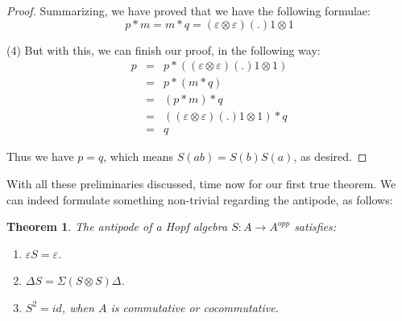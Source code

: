 \documentclass[12pt]{amsbook}
\newtheorem{theorem}{Theorem}[chapter]
\begin{document}
\begin{proof}
Summarizing, we have proved that we have the following formulae:
$$p*m=m*q=(\varepsilon\otimes\varepsilon)(.)1\otimes1$$

(4) But with this, we can finish our proof, in the following way:
\begin{eqnarray*}
p
&=&p*((\varepsilon\otimes\varepsilon)(.)1\otimes1)\\
&=&p*(m*q)\\
&=&(p*m)*q\\
&=&((\varepsilon\otimes\varepsilon)(.)1\otimes1)*q\\
&=&q
\end{eqnarray*}

Thus we have $p=q$, which means $S(ab)=S(b)S(a)$, as desired.
\end{proof}

With all these preliminaries discussed, time now for our first true theorem. We can indeed formulate something non-trivial regarding the antipode, as follows:

\begin{theorem}
The antipode of a Hopf algebra $S:A\to A^{opp}$ satisfies:
\begin{enumerate}
\item $\varepsilon S=\varepsilon$.

\item $\Delta S=\Sigma(S\otimes S)\Delta$.

\item $S^2=id$, when $A$ is commutative or cocommutative.
\end{enumerate}
\end{theorem}
\end{document}

